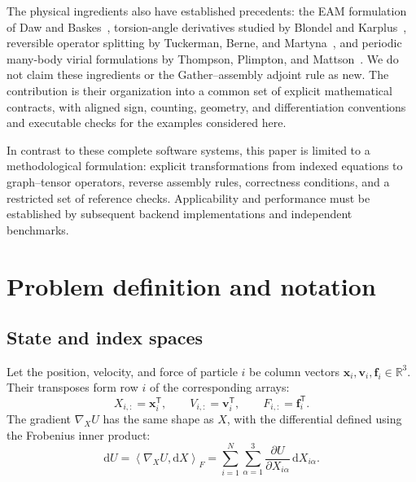 \documentclass[11pt,a4paper]{article}
\newcommand{\RR}{\mathbb R}
\newcommand{\dd}{\mathrm d}
\newcommand{\ip}[2]{\left\langle #1,#2\right\rangle}
\newcommand{\vect}[1]{\bm{#1}}
\theoremstyle{definition}
\begin{document}
The physical ingredients also have established precedents: the EAM formulation of Daw and
Baskes~\cite{daw1984}, torsion-angle derivatives studied by Blondel and
Karplus~\cite{blondel1996}, reversible operator splitting by Tuckerman, Berne, and
Martyna~\cite{tuckerman1992}, and periodic many-body virial formulations by Thompson,
Plimpton, and Mattson~\cite{thompson2009}. We do not claim these ingredients or the
Gather--assembly adjoint rule as new. The contribution is their organization into a common set
of explicit mathematical contracts, with aligned sign, counting, geometry, and differentiation
conventions and executable checks for the examples considered here.

In contrast to these complete software systems, this paper is limited to a methodological
formulation: explicit transformations from indexed equations to graph--tensor operators, reverse
assembly rules, correctness conditions, and a restricted set of reference checks. Applicability
and performance must be established by subsequent backend implementations and independent
benchmarks.
\section{Problem definition and notation}
\label{sec:notation}
\subsection{State and index spaces}
Let the position, velocity, and force of particle $i$ be column vectors $\vect x_i,\vect
v_i,\vect f_i\in\RR^3$. Their transposes form row $i$ of the corresponding arrays:
\begin{equation}
X_{i,:}=\vect x_i^{\mathsf T},\qquad
V_{i,:}=\vect v_i^{\mathsf T},\qquad
F_{i,:}=\vect f_i^{\mathsf T}.
\end{equation}
The gradient $\nabla_X U$ has the same shape as $X$, with the differential defined using the
Frobenius inner product:
\begin{equation}
\dd U=\ip{\nabla_XU}{\dd X}_F
=\sum_{i=1}^N\sum_{\alpha=1}^3
\frac{\partial U}{\partial X_{i\alpha}}\,\dd X_{i\alpha}.
\end{equation}
\end{document}
